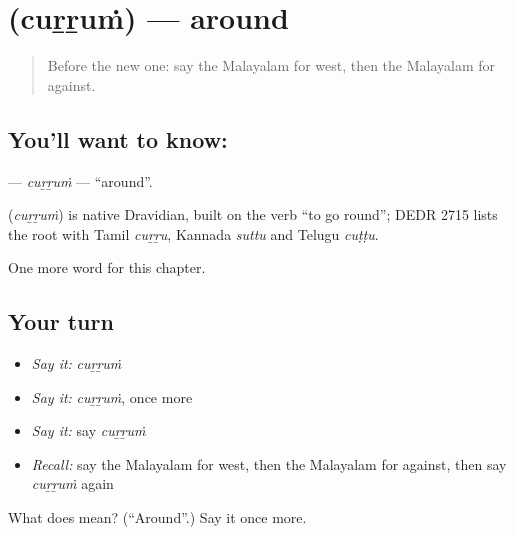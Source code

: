 \section[\texorpdfstring{\ml{ചുറ്റും} (cuṟṟuṁ)}{ചുറ്റും (cuṟṟuṁ)}]{ (cuṟṟuṁ) — around}

\label{lesson:ML-C198-currum}



\begin{quote}
Before the new one: say the Malayalam for west, then the Malayalam for against.
\end{quote}

\subsection*{You'll want to know: }
\textbf{} — \emph{cuṟṟuṁ} — \textquotedblleft{}around\textquotedblright{}.

\begin{cousinweb}
\textbf{} (\emph{cuṟṟuṁ}) is native Dravidian, built on the verb \textquotedblleft{}to go round\textquotedblright{}; DEDR 2715 lists the root with Tamil \emph{cuṟṟu}, Kannada \emph{suttu} and Telugu \emph{cuṭṭu}.
\end{cousinweb}

\begin{grammarlens}[title={What you've built}]
One more word for this chapter.
\end{grammarlens}

\subsection*{Your turn}
\begin{itemize}
\raggedright
  \item \emph{Say it:} \emph{cuṟṟuṁ}
  \item \emph{Say it:} \emph{cuṟṟuṁ}, once more
  \item \emph{Say it:} say \emph{cuṟṟuṁ}
  \item \emph{Recall:} say the Malayalam for west, then the Malayalam for against, then say \emph{cuṟṟuṁ} again
\end{itemize}

\begin{tcolorbox}[breakable,colback=teal!4,colframe=teal!35!black,title={Before you move on}]
What does  mean? (\textquotedblleft{}Around\textquotedblright{}.) Say it once more.
\end{tcolorbox}

